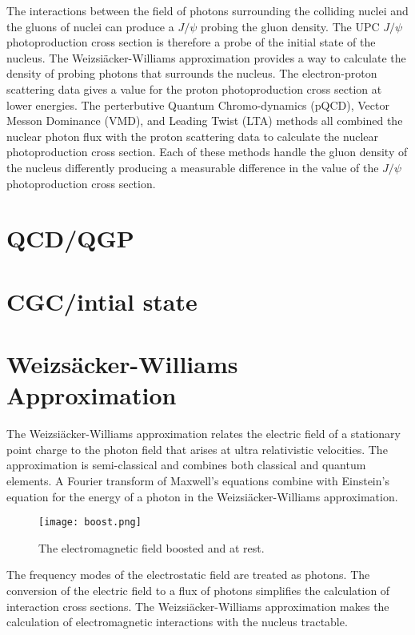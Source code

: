     The interactions between the field of photons surrounding the colliding 
      nuclei and the gluons of nuclei can produce a $J/\psi$ probing the 
      gluon density.
    The UPC $J/\psi$ photoproduction cross section is therefore a probe of 
      the initial state of the nucleus. 
    The Weizsi\"{a}cker-Williams approximation provides a way to calculate the 
      density of probing photons that surrounds the nucleus. 
    The electron-proton scattering data gives a value for the proton 
      photoproduction cross section at lower energies.
    The perterbutive Quantum Chromo-dynamics (pQCD), Vector Messon Dominance 
      (VMD), and Leading Twist (LTA) methods all combined the nuclear photon 
      flux with the proton scattering data to calculate the nuclear 
      photoproduction cross section.
    Each of these methods handle the gluon density of the nucleus differently 
      producing a measurable difference in the value of the $J/\psi$ 
      photoproduction cross section. 


  \section{QCD/QGP}


  \section{CGC/intial state}


  \section{Weizs\"{a}cker-Williams Approximation}
    The Weizsi\"{a}cker-Williams approximation relates the electric field of a 
      stationary point charge to the photon field that arises at ultra 
      relativistic velocities. 
    The approximation is semi-classical and combines both classical and quantum 
      elements.
    A Fourier transform of Maxwell's equations combine with Einstein's equation 
      for the energy of a photon in the Weizsi\"{a}cker-Williams approximation.
    \begin{wrapfigure}{r}{0.75\textwidth}
      \begin{center}
        \texttt{[image: boost.png]}
      \end{center}
      \caption{ \label{fig:boost} The electromagnetic field boosted and at rest. }
    \end{wrapfigure}
    The frequency modes of the electrostatic field are treated as photons. 
    The conversion of the electric field to a flux of photons simplifies the
      calculation of interaction cross sections. 
    The Weizsi\"{a}cker-Williams approximation makes the calculation of 
      electromagnetic interactions with the nucleus tractable. 

